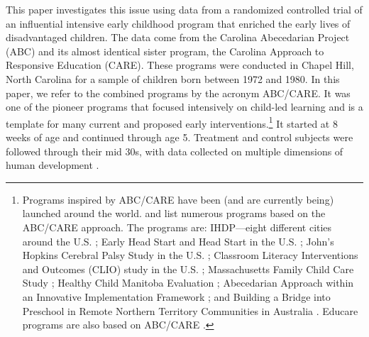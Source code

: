 This paper investigates this issue using data from a randomized controlled trial of an influential intensive early childhood program that enriched the early lives of disadvantaged children. The data come from the Carolina Abecedarian Project (ABC) and its almost identical sister program, the Carolina Approach to Responsive Education (CARE). These programs were conducted in Chapel Hill, North Carolina for a sample of children born between 1972 and 1980. In this paper, we refer to the combined programs by the acronym ABC/CARE. It was one of the pioneer programs that focused intensively on child-led learning and is a template for many current and proposed early interventions.\footnote{Programs inspired by ABC/CARE have been (and are currently being) launched around the world. \citet{Sparling_2010_Highlights} and \citet{Ramey_Ramey_Lanzi_2014_Interventions} list numerous programs based on the ABC/CARE approach. The programs are: IHDP---eight different cities around the U.S. \citep{Spiker-etal_1997_Helping}; Early Head Start and Head Start in the U.S. \citep{Schneider_McDonald-eds_2007_Scale-Up_Vol-1}; John's Hopkins Cerebral Palsy Study in the U.S. \citep{Sparling_2010_Highlights}; Classroom Literacy Interventions and Outcomes (CLIO) study in the U.S. \citep{Sparling_2010_Highlights}; Massachusetts Family Child Care Study \citep{Collins_etal_2010_Massachusetts-Study}; Healthy Child Manitoba Evaluation \citep{Healthy_Child_Manitoba_2015_Starting-Early}; Abecedarian Approach within an Innovative Implementation Framework \citep{Jensen_Nielsen_2016_ABC-Programme-Pilot}; and Building a Bridge into Preschool in Remote Northern Territory Communities in Australia \citep{UMonash_Dataset_2015_URL}. Educare programs are also based on ABC/CARE \citep{Educare_2014_Research_Agenda,Yazejian_Bryant_2012_Educare}.} It started at 8 weeks of age and continued through age 5. Treatment and control subjects were followed through their mid 30s, with data collected on multiple dimensions of human development \citep{Ramey_Campbell_1991_childreninpoverty}. 


